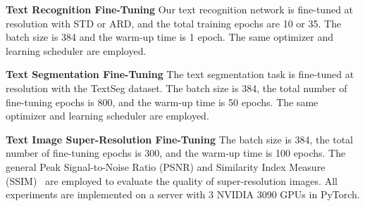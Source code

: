 \documentclass[10pt,twocolumn,letterpaper]{article}
\begin{document}
\noindent \textbf{Text Recognition Fine-Tuning}
Our text recognition network is fine-tuned at  resolution with STD or ARD, and the total training epochs are 10 or 35. The batch size is 384 and the warm-up time is 1 epoch. The same optimizer and learning scheduler are employed.

\noindent \textbf{Text Segmentation Fine-Tuning}
The text segmentation task is fine-tuned at  resolution with the TextSeg dataset. The batch size is 384, the total number of fine-tuning epochs is 800, and the warm-up time is 50 epochs. The same optimizer and learning scheduler are employed.

\noindent \textbf{Text Image Super-Resolution Fine-Tuning}
The batch size is 384, the total number of fine-tuning epochs is 300, and the warm-up time is 100 epochs. The general Peak Signal-to-Noise Ratio (PSNR) and Similarity Index Measure (SSIM)~\cite{superresolution} are employed to evaluate the quality of super-resolution images. All experiments are implemented on a server with 3 NVIDIA 3090 GPUs in PyTorch.
\end{document}
